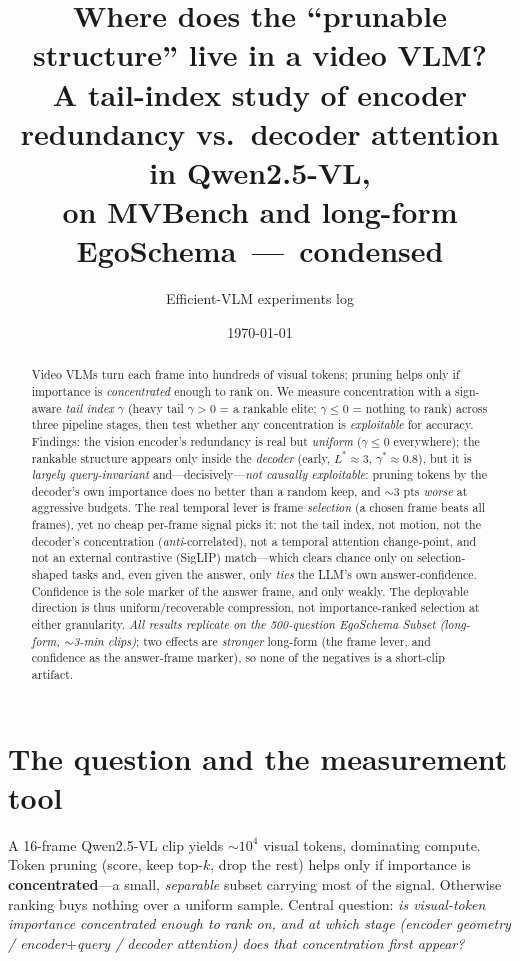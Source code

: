 \documentclass[11pt]{article}
\title{\textbf{Where does the ``prunable structure'' live in a video VLM?}\\[2pt]
\large A tail-index study of encoder redundancy vs.\ decoder attention in Qwen2.5-VL,\\
on MVBench and long-form EgoSchema \,---\, condensed}
\author{Efficient-VLM experiments log}
\date{\today}
\newcommand{\gm}{\gamma}
\begin{document}
\maketitle

\begin{abstract}
Video VLMs turn each frame into hundreds of visual tokens; pruning helps only if importance
is \emph{concentrated} enough to rank on. We measure concentration with a sign-aware
\emph{tail index} $\gm$ (heavy tail $\gm{>}0$ = a rankable elite; $\gm{\le}0$ = nothing to
rank) across three pipeline stages, then test whether any concentration is \emph{exploitable}
for accuracy. Findings: the vision encoder's redundancy is real but \emph{uniform} ($\gm{\le}0$
everywhere); the rankable structure appears only inside the \emph{decoder} (early, $L^{\!*}{\approx}3$,
$\gm^{*}{\approx}0.8$), but it is \emph{largely query-invariant} and---decisively---\emph{not
causally exploitable}: pruning tokens by the decoder's own importance does no better than a
random keep, and $\sim$3 pts \emph{worse} at aggressive budgets. The real temporal lever is
frame \emph{selection} (a chosen frame beats all frames), yet no cheap per-frame signal picks
it: not the tail index, not motion, not the decoder's concentration (\emph{anti}-correlated),
not a temporal attention change-point, and not an external contrastive (SigLIP) match---which
clears chance only on selection-shaped tasks and, even given the answer, only \emph{ties} the
LLM's own answer-confidence. Confidence is the sole marker of the answer frame, and only weakly.
The deployable direction is thus uniform/recoverable compression, not importance-ranked
selection at either granularity. \emph{All results replicate on the 500-question EgoSchema
Subset (long-form, $\sim$3-min clips)}; two effects are \emph{stronger} long-form (the frame
lever, and confidence as the answer-frame marker), so none of the negatives is a short-clip
artifact.
\end{abstract}

\section{The question and the measurement tool}
A 16-frame Qwen2.5-VL clip yields $\sim$$10^4$ visual tokens, dominating compute. Token pruning
(score, keep top-$k$, drop the rest) helps only if importance is \textbf{concentrated}---a small,
\emph{separable} subset carrying most of the signal. Otherwise ranking buys nothing over a uniform
sample. Central question: \emph{is visual-token importance concentrated enough to rank on, and at
which stage (encoder geometry / encoder$+$query / decoder attention) does that concentration first
appear?}
\end{document}
